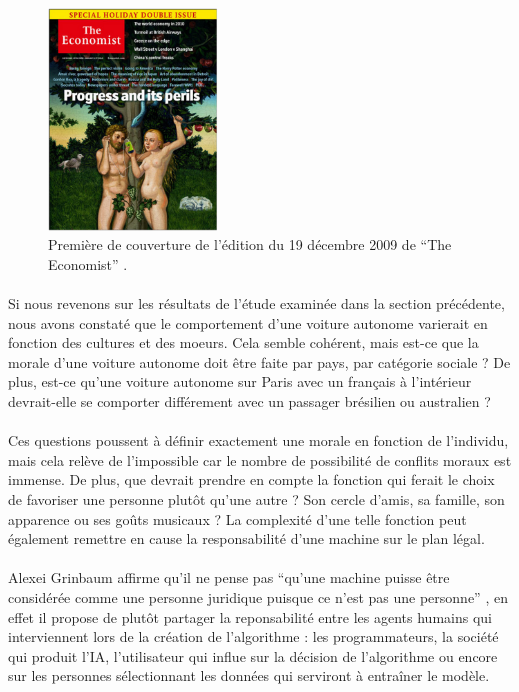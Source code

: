 \documentclass[10pt, french, a4paper]{report}
\begin{document}
\begin{figure}[hbt!]
  \centering
  \includegraphics[width=0.4\textwidth]{images/the_economist_200091219.png}
  \caption{Première de couverture de l'édition du 19 décembre 2009 de ``The Economist'' \cite{theeconomist_progress_2009}.}
  \label{fig:the_economist}
\end{figure}

\paragraph{}
Si nous revenons sur les résultats de l'étude examinée dans la section précédente, nous avons constaté que le comportement d'une voiture autonome varierait en fonction des cultures et des moeurs. Cela semble cohérent, mais est-ce que la morale d'une voiture autonome doit être faite par pays, par catégorie sociale ? De plus, est-ce qu'une voiture autonome sur Paris avec un français à l'intérieur devrait-elle se comporter différement avec un passager brésilien ou australien ?   

\paragraph{}
Ces questions poussent à définir exactement une morale en fonction de l'individu, mais cela relève de l'impossible car le nombre de possibilité de conflits moraux est immense. De plus, que devrait prendre en compte la fonction qui ferait le choix de favoriser une personne plutôt qu'une autre ? Son cercle d'amis, sa famille, son apparence ou ses goûts musicaux ? La complexité d'une telle fonction peut également remettre en cause la responsabilité d'une machine sur le plan légal.

\paragraph{}
Alexei Grinbaum affirme qu'il ne pense pas ``qu’une machine puisse être considérée comme une personne juridique puisque ce n’est pas une personne'' \citep{grinbaum__2019}, en effet il propose de plutôt partager la reponsabilité entre les agents humains qui interviennent lors de la création de l'algorithme : les programmateurs, la société qui produit l'IA, l'utilisateur qui influe sur la décision de l'algorithme ou encore sur les personnes sélectionnant les données qui serviront à entraîner le modèle.
\end{document}
